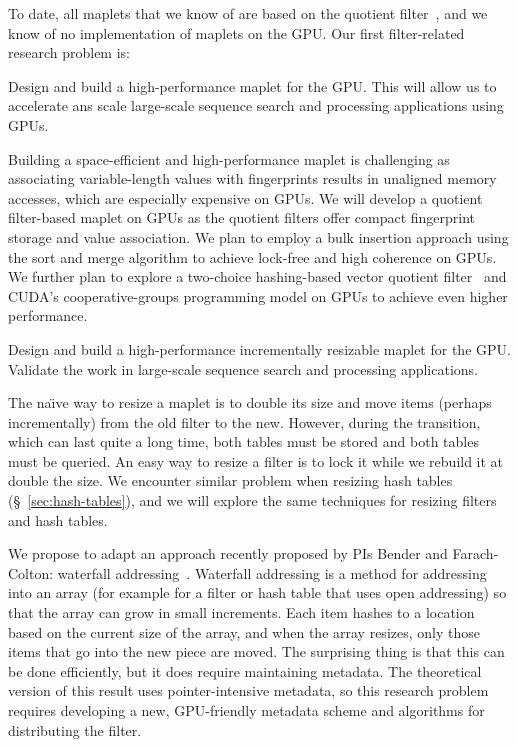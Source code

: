 To date, all maplets that we know of are based on the quotient filter~\cite{conway2020splinterdb,PandeyBJP17,DBLP:journals/pacmmod/ConwayFJ23}, and we know of no implementation of maplets on the GPU\@.
Our first filter-related research problem is:

\begin{rproblem}
Design and build a high-performance maplet for the GPU\@. This will allow us to accelerate ans scale large-scale sequence search and \kmer processing applications using GPUs. 
\end{rproblem}

Building a space-efficient and high-performance maplet is challenging as associating variable-length values with fingerprints results in unaligned memory accesses, which are especially expensive on GPUs. We will develop a quotient filter-based maplet on GPUs as the quotient filters offer compact fingerprint storage and value association. We plan to employ a bulk insertion approach using the sort and merge algorithm to achieve lock-free and high coherence on GPUs. We further plan to explore a two-choice hashing-based vector quotient filter~\cite{PandeyCDBFJ21} and CUDA's cooperative-groups programming model on GPUs to achieve even higher performance.

\begin{rproblem}\label{rprob:resizable-maplet}
Design and build a high-performance incrementally resizable maplet for the GPU. Validate the work in large-scale sequence search and \kmer processing applications.
\end{rproblem}

The na\"\i{}ve way to resize a maplet is to double its size and move items (perhaps incrementally) from the old filter to the new.  However, during the transition, which can last quite a long time, both tables must be stored and both tables must be queried. An easy way to resize a filter is to lock it while we rebuild it at double the size.  We encounter similar problem when resizing hash tables (\S~\ref{sec:hash-tables}), and we will explore the same techniques for resizing filters and hash tables.

We propose to adapt an approach recently proposed by PIs Bender and Farach-Colton: waterfall addressing~\cite{BenderFaKu22b}.   Waterfall addressing is a method for addressing into an array (for example for a filter or hash table that uses open addressing) so that the array can grow in small increments.  Each item hashes to a location based on the current size of the array, and when the array resizes, only those items that go into the new piece are moved.  The surprising thing is that this can be done efficiently, but it does require maintaining metadata.  The theoretical version of this result uses pointer-intensive metadata, so this research problem requires developing a new, GPU-friendly metadata scheme and algorithms for distributing the filter. 

